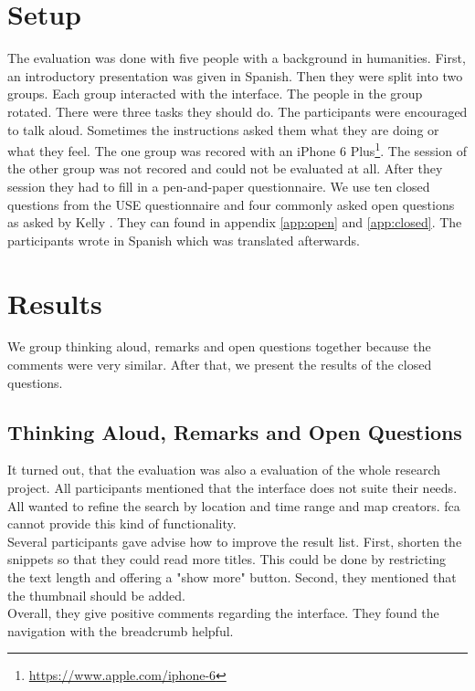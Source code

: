 \documentclass[11pt]{report}
\begin{document}
\section{Setup}

The evaluation was done with five people with a background in humanities. First, an introductory presentation was given in Spanish. Then they were split into two groups. Each group interacted with the interface. The people in the group rotated. There were three tasks they should do. The participants were encouraged to talk aloud. Sometimes the instructions asked them what they are doing or what they feel. The one group was recored with an iPhone 6 Plus\footnote{\url{https://www.apple.com/iphone-6}}. The session of the other group was not recored and could not be evaluated at all. After they session they had to fill in a pen-and-paper questionnaire. We use ten closed questions from the USE questionnaire \cite{lund2001measuring} and four commonly asked open questions as asked by Kelly \cite{Kelly2008}. They can found in appendix \ref{app:open} and \ref{app:closed}. The participants wrote in Spanish which was translated afterwards.

\section{Results}

We group thinking aloud, remarks and open questions together because the comments were very similar. After that, we present the results of the closed questions.

\subsection{Thinking Aloud, Remarks and Open Questions}
It turned out, that the evaluation was also a evaluation of the whole research project. All participants mentioned that the interface does not suite their needs. All wanted to refine the search by location and time range and map creators. \acrshort{fca} cannot provide this kind of functionality.\\

Several participants gave advise how to improve the result list. First, shorten the snippets so that they could read more titles. This could be done by restricting the text length and offering a "show more" button. Second, they mentioned that the thumbnail should be added. \\

Overall, they give positive comments regarding the interface. They found the navigation with the breadcrumb helpful. \\
\end{document}
